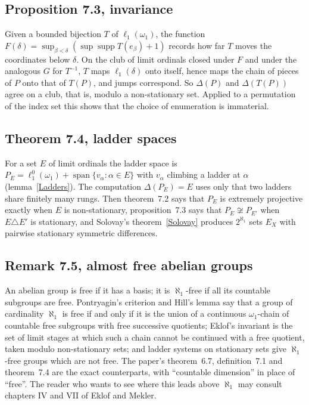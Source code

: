 \documentclass[12pt]{article}
\theoremstyle{definition}
\theoremstyle{remark}
\newcommand{\lo}[1]{\ell_1^0(#1)}
\newcommand{\ellone}[1]{\ell_1(#1)}
\newcommand{\supp}{\operatorname{supp}}
\newcommand{\Lin}{\operatorname{span}}
\begin{document}
\subsection*{Proposition 7.3, invariance}

Given a bounded bijection $T$ of $\ellone{\omega_1}$, the function
$F(\delta)=\sup_{\beta<\delta}(\sup\supp T(e_\beta)+1)$ records how far $T$
moves the coordinates below $\delta$. On the club of limit ordinals closed
under $F$ and under the analogous $G$ for $T^{-1}$, $T$ maps $\ellone{\delta}$
onto itself, hence maps the chain of pieces of $P$ onto that of $T(P)$, and
jumps correspond. So $\Delta(P)$ and $\Delta(T(P))$ agree on a club, that is,
modulo a non-stationary set. Applied to a permutation of the index set this
shows that the choice of enumeration is immaterial.

\subsection*{Theorem 7.4, ladder spaces}

For a set $E$ of limit ordinals the ladder space is
$P_E=\lo{\omega_1}+\Lin\{v_\alpha:\alpha\in E\}$ with $v_\alpha$ climbing a
ladder at $\alpha$ (lemma~\ref{Ladders}). The computation
$\Delta(P_E)=E$ uses only that two ladders share finitely many rungs. Then
theorem~7.2 says that $P_E$ is extremely projective exactly when $E$ is
non-stationary, proposition~7.3 says that $P_E\not\cong P_{E'}$ when
$E\triangle E'$ is stationary, and Solovay's theorem~\ref{Solovay} produces
$2^{\aleph_1}$ sets $E_X$ with pairwise stationary symmetric differences.

\subsection*{Remark 7.5, almost free abelian groups}

An abelian group is free if it has a basis; it is $\aleph_1$-free if all its
countable subgroups are free. Pontryagin's criterion and Hill's lemma say
that a group of cardinality $\aleph_1$ is free if and only if it is the union
of a continuous $\omega_1$-chain of countable free subgroups with free
successive quotients; Eklof's invariant is the set of limit stages at which
such a chain cannot be continued with a free quotient, taken modulo
non-stationary sets; and ladder systems on stationary sets give
$\aleph_1$-free groups which are not free. The paper's theorem~6.7,
definition~7.1 and theorem~7.4 are the exact counterparts, with ``countable
dimension'' in place of ``free''. The reader who wants to see where this
leads above $\aleph_1$ may consult chapters IV and VII of Eklof and Mekler.
\end{document}

